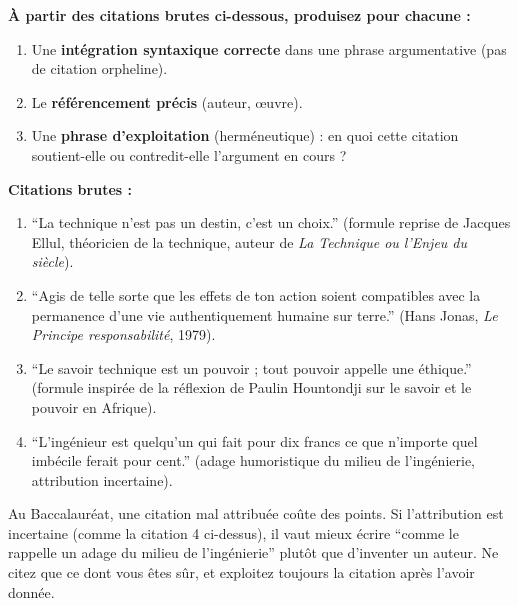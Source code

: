 \documentclass[11pt]{article}
\newcounter{popsec}
\newcounter{popsub}
\newcommand{\courssub}[1]{%
  \stepcounter{popsub}%
  \par\vspace{9pt}\noindent{\popxbold\fontsize{11.5}{13}\selectfont\color{popink}{\color{poporange}\thepopsec.\thepopsub}\hspace{6pt}#1}\par\nopagebreak\vspace{4pt}
}
\begin{document}
\begin{exercice}
\textbf{À partir des citations brutes ci-dessous, produisez pour chacune :}
\begin{enumerate}
    \item Une \textbf{intégration syntaxique correcte} dans une phrase argumentative (pas de citation orpheline).
    \item Le \textbf{référencement précis} (auteur, œuvre).
    \item Une \textbf{phrase d'exploitation} (herméneutique) : en quoi cette citation soutient-elle ou contredit-elle l'argument en cours ?
\end{enumerate}
\textbf{Citations brutes :}
\begin{enumerate}
    \item ``La technique n'est pas un destin, c'est un choix.'' (formule reprise de Jacques Ellul, théoricien de la technique, auteur de \emph{La Technique ou l'Enjeu du siècle}).
    \item ``Agis de telle sorte que les effets de ton action soient compatibles avec la permanence d'une vie authentiquement humaine sur terre.'' (Hans Jonas, \emph{Le Principe responsabilité}, 1979).
    \item ``Le savoir technique est un pouvoir ; tout pouvoir appelle une éthique.'' (formule inspirée de la réflexion de Paulin Hountondji sur le savoir et le pouvoir en Afrique).
    \item ``L'ingénieur est quelqu'un qui fait pour dix francs ce que n'importe quel imbécile ferait pour cent.'' (adage humoristique du milieu de l'ingénierie, attribution incertaine).
\end{enumerate}
\end{exercice}

\begin{attention}
Au Baccalauréat, une citation mal attribuée coûte des points. Si l'attribution est incertaine (comme la citation 4 ci-dessus), il vaut mieux écrire ``comme le rappelle un adage du milieu de l'ingénierie'' plutôt que d'inventer un auteur. Ne citez que ce dont vous êtes sûr, et exploitez toujours la citation après l'avoir donnée.
\end{attention}

\courssub{Je me prépare au Bac}
\end{document}
